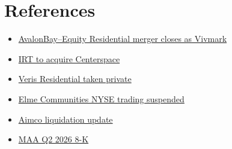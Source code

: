 \documentclass[11pt]{article}
\begin{document}
\section*{References}
\small
\begin{itemize}[itemsep=1pt, label={}]
  \item \href{https://www.regardsofwallstreet.com/news/avalonbay-avb-merger-closes-vmrk-august-17}{AvalonBay--Equity Residential merger closes as Vivmark}
  \item \href{https://www.insidearbitrage.com/?p=174660}{IRT to acquire Centerspace}
  \item \href{https://www.multihousingnews.com/affinius-capital-jv-closes-3-5b-acquisition-of-veris-residential/}{Veris Residential taken private}
  \item \href{https://finviz.com/news/407432/elme-communities-announces-suspended-nyse-trading-anticipates-trading-will-begin-otc-effective-october-26-2026}{Elme Communities NYSE trading suspended}
  \item \href{https://digital-release.kxan.com/business/press-releases/cision/20260330LA22745/aimco-provides-update-on-liquidation-activities}{Aimco liquidation update}
  \item \href{https://www.sec.gov/Archives/edgar/data/0000912595/000119312526323756/maa-ex99_1.htm}{MAA Q2 2026 8-K}
\end{itemize}
\end{document}
